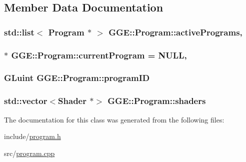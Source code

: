 \subsection{Member Data Documentation}
\hypertarget{class_g_g_e_1_1_program_ac6342a249c1333e4364bf8e4ac0d9b39}{
\subsubsection[{active\+Programs}]{\setlength{\rightskip}{0pt plus 5cm}std\+::list$<$ {\bf Program} $\ast$ $>$ G\+G\+E\+::\+Program\+::active\+Programs\hspace{0.3cm}{\ttfamily [static]}, {\ttfamily [private]}}}\label{class_g_g_e_1_1_program_ac6342a249c1333e4364bf8e4ac0d9b39}
\hypertarget{class_g_g_e_1_1_program_a006a547745798242ceb402b9e5a1ed1b}{
\subsubsection[{current\+Program}]{ $\ast$ G\+G\+E\+::\+Program\+::current\+Program = N\+U\+L\+L\hspace{0.3cm}{\ttfamily [static]}, {\ttfamily [private]}}}\label{class_g_g_e_1_1_program_a006a547745798242ceb402b9e5a1ed1b}
\hypertarget{class_g_g_e_1_1_program_aa011e6183ba2be3e3d99d9e03101fb3d}{
\subsubsection[{program\+I\+D}]{\setlength{\rightskip}{0pt plus 5cm}G\+Luint G\+G\+E\+::\+Program\+::program\+I\+D\hspace{0.3cm}{\ttfamily [private]}}}\label{class_g_g_e_1_1_program_aa011e6183ba2be3e3d99d9e03101fb3d}
\hypertarget{class_g_g_e_1_1_program_a6f31b509c852f7271282d5ad79056b18}{
\subsubsection[{shaders}]{\setlength{\rightskip}{0pt plus 5cm}std\+::vector$<${\bf Shader} $\ast$$>$ G\+G\+E\+::\+Program\+::shaders\hspace{0.3cm}{\ttfamily [private]}}}\label{class_g_g_e_1_1_program_a6f31b509c852f7271282d5ad79056b18}


The documentation for this class was generated from the following files\+:\begin{DoxyCompactItemize}
\item 
include/\hyperlink{program_8h}{program.\+h}\item 
src/\hyperlink{program_8cpp}{program.\+cpp}\end{DoxyCompactItemize}
